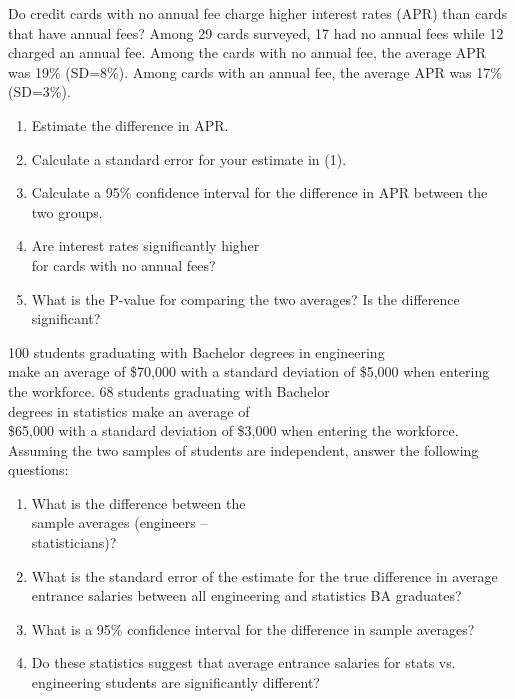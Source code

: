 \documentclass[11pt]{book}\usepackage[]{graphicx}\usepackage[]{color}
\begin{document}
\begin{exercises}
\begin{exercise} %

Do credit cards with no annual fee charge higher interest rates (APR) than cards that have annual fees?  Among 29 cards surveyed, 17 had no annual fees while 12 charged an annual fee.  Among the cards with no annual fee, the average APR was 19\% (SD=8\%).  Among cards with an annual fee, the average APR was 17\% (SD=3\%).

\begin{enumerate}
  \item Estimate the difference in APR.
  \item Calculate a standard error for your estimate in (1).
  \item Calculate a 95\% confidence interval for the difference in APR between the two groups.
  \item Are interest rates significantly higher \\ for cards with no annual fees?
  \item What is the P-value for comparing the two averages? Is the difference significant?
\end{enumerate}
\end{exercise}
\begin{solution} %


\end{solution}

\begin{exercise}  %

100 students graduating  with Bachelor degrees in engineering \\ make an average of \$70,000 with a standard deviation of \$5,000 when entering the workforce. 68 students graduating with Bachelor \\ degrees in statistics make an average of \\ \$65,000 with a standard deviation of \$3,000 when entering the workforce. Assuming the two samples of students are independent, answer the following questions:

\begin{enumerate}
  \item What is the difference between the \\ sample averages (engineers – \\ statisticians)?
  \item What is the standard error of the estimate for the true difference in average entrance salaries between all engineering and statistics BA graduates?
  \item What is a 95\% confidence interval for the difference in sample averages?
  \item Do these statistics suggest that average entrance salaries for stats vs. engineering students are significantly different?
\end{enumerate}


\end{exercise}
\end{exercises}
\end{document}
